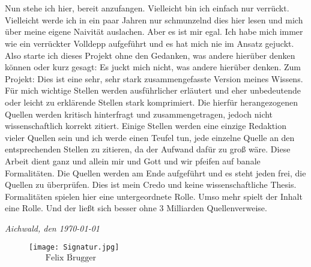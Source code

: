 \\~\\
Nun stehe ich hier, bereit anzufangen. Vielleicht bin ich einfach nur verrückt. Vielleicht werde ich in ein paar Jahren nur schmunzelnd dies hier lesen und mich über meine eigene Naivität auslachen. Aber es ist mir egal. Ich habe mich immer wie ein verrückter Volldepp aufgeführt und es hat mich nie im Ansatz gejuckt.  Also starte ich dieses Projekt ohne den Gedanken, was andere hierüber denken können oder kurz gesagt: Es juckt mich nicht, was andere hierüber denken.
\newpage
Zum Projekt: Dies ist eine sehr, sehr stark zusammengefasste Version meines Wissens. Für mich wichtige Stellen werden ausführlicher erläutert und eher unbedeutende oder leicht zu erklärende Stellen stark komprimiert. Die hierfür herangezogenen Quellen werden kritisch hinterfragt und zusammengetragen, jedoch nicht wissenschaftlich korrekt zitiert. Einige Stellen werden eine einzige Redaktion vieler Quellen sein und ich werde einen Teufel tun, jede einzelne Quelle an den entsprechenden Stellen zu zitieren, da der Aufwand dafür zu groß wäre. Diese Arbeit dient ganz und allein mir und Gott und wir pfeifen auf banale Formalitäten. Die Quellen werden am Ende aufgeführt und es steht jeden frei, die Quellen zu überprüfen. Dies ist mein Credo und keine wissenschaftliche Thesis. Formalitäten spielen hier eine untergeordnete Rolle. Umso mehr spielt der Inhalt eine Rolle. Und der ließt sich besser ohne 3 Milliarden Quellenverweise.
\bigskip
\begin{flushright}
\textit{Aichwald, den \today}
\end{flushright}
\bigskip
\bigskip
\bigskip
\bigskip
\bigskip
\bigskip
\bigskip
\bigskip
\bigskip
\begin{figure}[h]
\begin{flushright}
\texttt{[image: Signatur.jpg]}\\
$\overline{~~~~~~~~~\mbox{Felix Brugger}~~~~~~~~~}$
\end{flushright}
\end{figure}